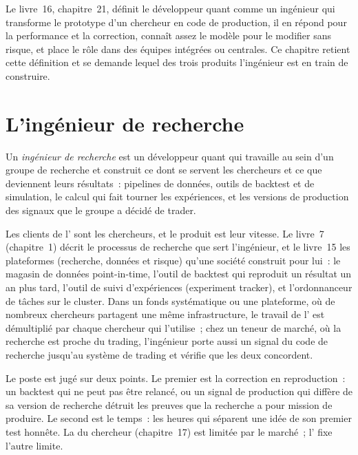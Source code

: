 Le livre~16, chapitre~21, définit le développeur quant comme un ingénieur qui transforme le prototype d'un chercheur en code de production,
il en répond pour la performance et la correction, connaît assez le modèle pour le modifier sans risque, et place le rôle dans des équipes intégrées
ou centrales. Ce chapitre retient cette définition et se demande lequel des trois produits l'ingénieur est en train de construire.

\section{L'ingénieur de recherche}

\begin{definition}\label{def:in:quant-developer:research}
Un \emph{ingénieur de recherche} est un développeur quant qui travaille au sein d'un groupe de recherche et construit
ce dont se servent les chercheurs et ce que deviennent leurs résultats~: pipelines de données, outils de backtest et de simulation, le
calcul qui fait tourner les expériences, et les versions de production des signaux que le groupe a décidé de trader.
\end{definition}

Les clients de l' sont les chercheurs, et le produit est leur vitesse. Le livre~7 (chapitre~1) décrit le
processus de recherche que sert l'ingénieur, et le livre~15 les plateformes (recherche, données et risque) qu'une société construit pour lui~:
le magasin de données point-in-time, l'outil de backtest qui reproduit un résultat un an plus tard, l'outil de suivi d'expériences (experiment tracker), et
l'ordonnanceur de tâches sur le cluster. Dans un fonds systématique ou une plateforme, où de nombreux chercheurs partagent une même infrastructure, le
travail de l' est démultiplié par chaque chercheur qui l'utilise~; chez un teneur de marché, où la recherche est proche du
trading, l'ingénieur porte aussi un signal du code de recherche jusqu'au système de trading et vérifie que les deux concordent.

Le poste est jugé sur deux points. Le premier est la correction en reproduction~: un backtest qui ne peut pas être relancé, ou un
signal de production qui diffère de sa version de recherche détruit les preuves que la recherche a pour mission de produire. Le second
est le temps~: les heures qui séparent une idée de son premier test honnête. La  du chercheur (chapitre~17) est limitée par
le marché~; l' fixe l'autre limite.

